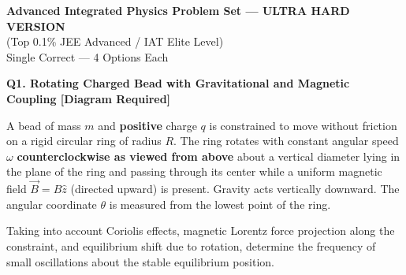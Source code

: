 \documentclass[12pt]{article}
\begin{document}
\begin{center}
\Large \textbf{Advanced Integrated Physics Problem Set — ULTRA HARD VERSION}\\
\large (Top 0.1\% JEE Advanced / IAT Elite Level)\\
\large Single Correct — 4 Options Each
\end{center}

\bigskip


\textbf{Q1. Rotating Charged Bead with Gravitational and Magnetic Coupling [Diagram Required]}

A bead of mass $m$ and \textbf{positive} charge $q$ is constrained to move without friction on a rigid circular ring of radius $R$. The ring rotates with constant angular speed $\omega$ \textbf{counterclockwise as viewed from above} about a vertical diameter lying in the plane of the ring and passing through its center while a uniform magnetic field $ \vec B = B\hat z $ (directed upward) is present. Gravity acts vertically downward. The angular coordinate $\theta$ is measured from the lowest point of the ring.

Taking into account Coriolis effects, magnetic Lorentz force projection along the constraint, and equilibrium shift due to rotation, determine the frequency of small oscillations about the stable equilibrium position.

\begin{center}
\end{center}
\end{document}
